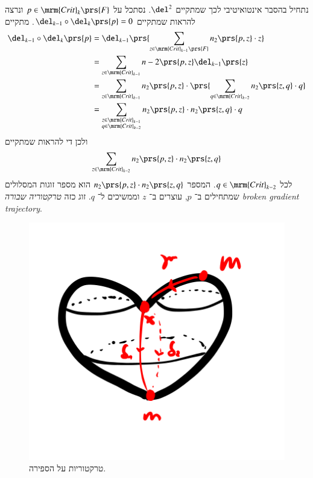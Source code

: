 \documentclass[a4paper,10pt,twoside,openany]{book}
\begin{document}
נתחיל בהסבר אינטואיטיבי לכך שמתקיים
$\del^2$.
נסתכל על
$p \in \mrm{Crit}_k\prs{F}$
ונרצה להראות שמתקיים
$\del_{k-1} \circ \del_k\prs{p} = 0$.
מתקיים
\begin{align*}
\del_{k-1} \circ \del_k\prs{p} &= \del_{k-1} \prs{\sum_{z \in \mrm{Crit}_{k-1}\prs{F}} n_2\prs{p, z} \cdot z}
\\&=
\sum_{z \in \mrm{Crit}_{k-1}} n-2\prs{p,z} \del_{k-1}\prs{z}
\\&=
\sum_{z \in \mrm{Crit}_{k-1}} n_2\prs{p,z} \cdot \prs{\sum_{q \in \mrm{Crit}_{k-2}} n_2\prs{z,q} \cdot q}
\\&=
\sum_{\substack{z \in \mrm{Crit}_{k-1} \\ q \in \mrm{Crit}_{k-2}}} n_2\prs{p,z} \cdot n_2\prs{z,q} \cdot q
\end{align*}
ולכן די להראות שמתקיים
\[\sum_{z \in \mrm{Crit}_{k-2}} n_2\prs{p,z} \cdot n_2\prs{z,q}\]
לכל
$q \in \mrm{Crit}_{k-2}$.
המספר
$n_2\prs{p,z} \cdot n_2\prs{z,q}$
הוא מספר זוגות המסלולים שמתחילים ב־%
$p$,
עוצרים ב־%
$z$
וממשיכים ל־%
$q$.
זוג כזה
\emph{טרקטוריה שבורה \textenglish{broken gradient trajectory}}.

\begin{figure}
\centering
\includegraphics[scale=0.5]{sources/6.2.a}
\caption{טרקטוריות על הספירה.}
\label{6.2.a}
\end{figure}
\end{document}

